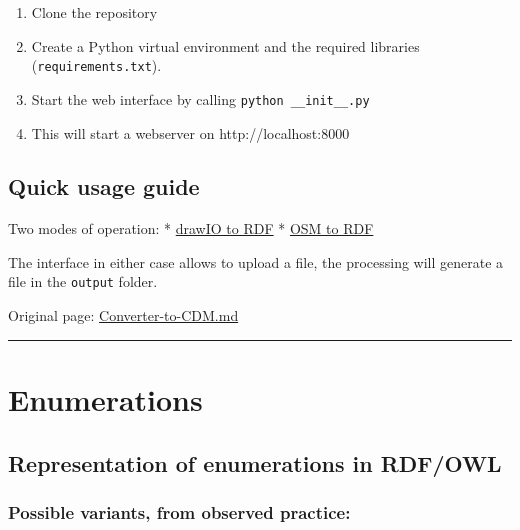 \documentclass[
  11pt,
]{article}
\providecommand{\tightlist}{%
  \setlength{\itemsep}{0pt}\setlength{\parskip}{0pt}}
\begin{document}
\begin{enumerate}
\def\labelenumi{\arabic{enumi}.}
\tightlist
\item
  Clone the repository
\item
  Create a Python virtual environment and the required libraries
  (\texttt{requirements.txt}).
\item
  Start the web interface by calling \texttt{python\ \_\_init\_\_.py}
\item
  This will start a webserver on http://localhost:8000
\end{enumerate}

\hypertarget{quick-usage-guide}{%
\subsection{Quick usage guide}\label{quick-usage-guide}}

Two modes of operation: *
\href{http://localhost:8000/drawio_to_rdf}{drawIO to RDF} *
\href{http://localhost:8000/osm_to_rdf}{OSM to RDF}

The interface in either case allows to upload a file, the processing
will generate a file in the \texttt{output} folder.

Original page:
\href{https://github.com/UICrail/CDM-RSM/wiki/Converter-to-CDM}{Converter-to-CDM.md}

\begin{center}\rule{0.5\linewidth}{0.5pt}\end{center}

\hypertarget{enumerations}{%
\section{Enumerations}\label{enumerations}}

\hypertarget{representation-of-enumerations-in-rdfowl}{%
\subsection{Representation of enumerations in
RDF/OWL}\label{representation-of-enumerations-in-rdfowl}}

\hypertarget{possible-variants-from-observed-practice}{%
\subsubsection{Possible variants, from observed
practice:}\label{possible-variants-from-observed-practice}}
\end{document}

